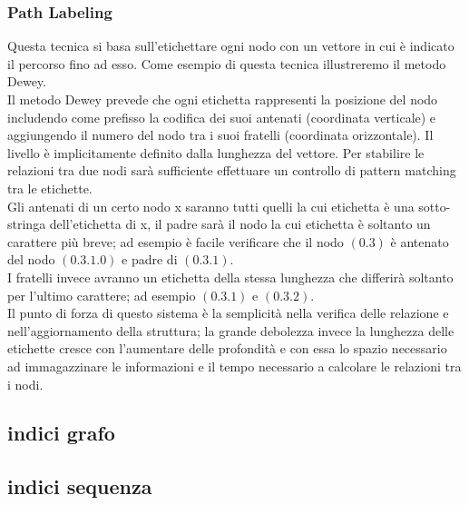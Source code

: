 \documentclass[12pt,a4paper,openright,twoside]{report}
\theoremstyle{definition}
\begin{document}
\subsubsection{Path Labeling}
Questa tecnica si basa sull'etichettare ogni nodo con un vettore in cui è indicato il percorso fino ad esso. Come esempio di questa tecnica illustreremo il metodo Dewey.
\\
Il metodo Dewey prevede che ogni etichetta rappresenti la posizione del nodo includendo come prefisso la codifica dei suoi antenati (coordinata verticale) e aggiungendo il numero del nodo tra i suoi fratelli (coordinata orizzontale). Il livello è implicitamente definito dalla lunghezza del vettore.
Per stabilire le relazioni tra due nodi sarà sufficiente effettuare un controllo di pattern matching tra le etichette.
\\
Gli antenati di un certo nodo x saranno tutti quelli la cui etichetta è una sotto-stringa dell'etichetta di x, il padre sarà il nodo la cui etichetta è soltanto un carattere più breve; ad esempio è facile verificare che il nodo $(0.3)$ è antenato del nodo $(0.3.1.0)$ e padre di $(0.3.1)$.
\\
I fratelli invece avranno un etichetta della stessa lunghezza che differirà soltanto per l'ultimo carattere; ad esempio $(0.3.1)$ e $(0.3.2)$.
\\
Il punto di forza di questo sistema è la semplicità nella verifica delle relazione e nell'aggiornamento della struttura; la grande debolezza invece la lunghezza delle etichette cresce con l'aumentare delle profondità e con essa lo spazio necessario ad immagazzinare le informazioni e il tempo necessario a calcolare le relazioni tra i nodi.
\subsection{indici grafo}
\subsection{indici sequenza}
\end{document}
